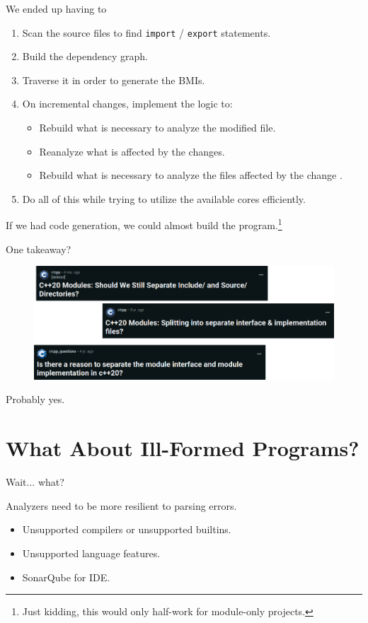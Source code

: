 \documentclass[aspectratio=169]{beamer}
\begin{document}
\begin{frame}{We ended up having to}
  \begin{enumerate}
    \item Scan the source files to find \texttt{import} / \texttt{export} statements.
    \item Build the dependency graph.
    \item Traverse it in order to generate the BMIs.
    \item On incremental changes, implement the logic to:
          \begin{itemize}
            \item Rebuild what is necessary to analyze the modified file.
            \item Reanalyze what is affected by the changes.
            \item Rebuild what is necessary to analyze the files affected by the change .
          \end{itemize}
    \item Do all of this while trying to utilize the available cores efficiently.
  \end{enumerate}
  If we had code generation, we could almost build the program.\footnote{\tiny Just kidding, this would only half-work for module-only projects.}
\end{frame}

\begin{frame}{One takeaway?}
  \begin{figure}
    \includegraphics[width=0.5\linewidth]{questions.png}
  \end{figure}
  \centering
  Probably yes.
\end{frame}

\section*{What About Ill-Formed Programs?}
\begin{frame}{Wait... what?}
  \begin{block}{}
    Analyzers need to be more resilient to parsing errors.
    \begin{itemize}
      \item Unsupported compilers or unsupported builtins.
      \item Unsupported language features.
      \item SonarQube for IDE.
    \end{itemize}
  \end{block}
\end{frame}
\end{document}
